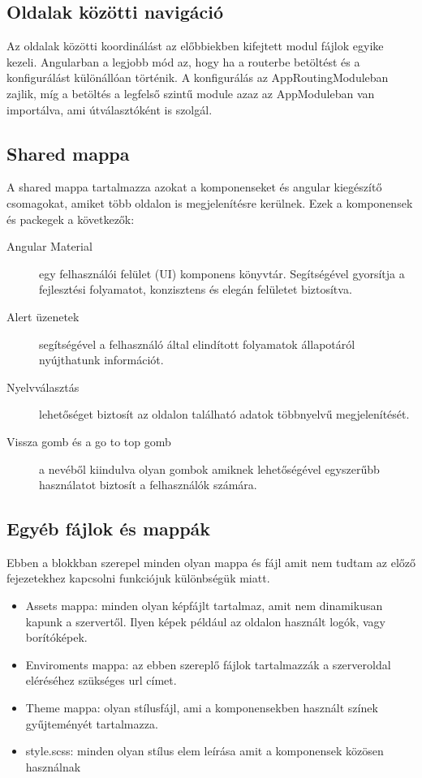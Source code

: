 \subsection{Oldalak közötti navigáció}
Az oldalak közötti koordinálást az előbbiekben kifejtett modul fájlok egyike kezeli. Angularban a legjobb mód az, hogy ha a routerbe betöltést és a konfigurálást különállóan történik. A konfigurálás az AppRoutingModuleban zajlik, míg a betöltés a legfelső szintű module azaz az AppModuleban van importálva, ami útválasztóként is szolgál.

\subsection{Shared mappa}
A shared mappa tartalmazza azokat a komponenseket és angular kiegészítő csomagokat, amiket több oldalon is megjelenítésre kerülnek. Ezek a komponensek és packegek a következők:

\begin{description}
	\item[Angular Material] egy felhasználói felület (UI) komponens könyvtár. Segítségével gyorsítja a fejlesztési folyamatot, konzisztens és elegán felületet biztosítva.
	\item[Alert üzenetek] segítségével a felhasználó által elindított folyamatok állapotáról nyújthatunk információt.
	\item[Nyelvválasztás] lehetőséget biztosít az oldalon található adatok többnyelvű megjelenítését.
	\item[Vissza gomb és a go to top gomb] a nevéből kiindulva olyan gombok amiknek lehetőségével egyszerűbb használatot biztosít a felhasználók számára.
\end{description}

\subsection{Egyéb fájlok és mappák}
Ebben a blokkban szerepel minden olyan mappa és fájl amit nem tudtam az előző fejezetekhez kapcsolni funkciójuk különbségük miatt.

\begin{itemize}
	\item Assets mappa: minden olyan képfájlt tartalmaz, amit nem dinamikusan kapunk a szervertől. Ilyen képek például az oldalon használt logók, vagy borítóképek.
	\item Enviroments mappa: az ebben szereplő fájlok tartalmazzák a szerveroldal eléréséhez szükséges url címet.
	\item Theme mappa: olyan stílusfájl, ami a komponensekben használt színek gyűjteményét tartalmazza.
	\item style.scss: minden olyan stílus elem leírása amit a komponensek közösen használnak
\end{itemize}

